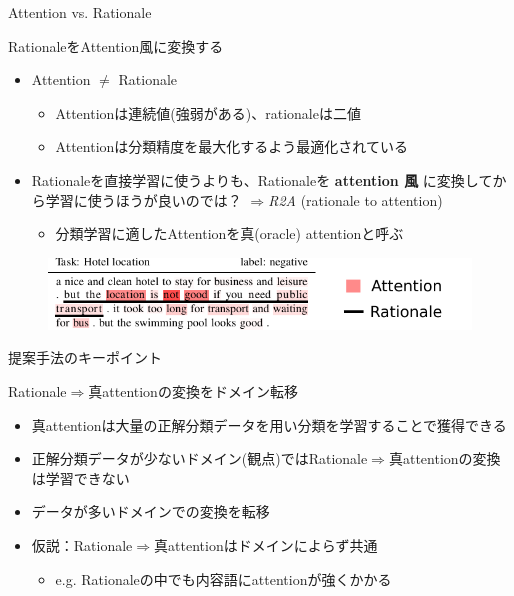 \begin{frame}{Attention vs. Rationale}
\begin{lead}
    RationaleをAttention風に変換する
\end{lead}
\begin{itemize}
\item Attention $\neq$ Rationale
\begin{itemize}
    \item Attentionは連続値(強弱がある)、rationaleは二値
    \item Attentionは分類精度を最大化するよう最適化されている
\end{itemize}
\item Rationaleを直接学習に使うよりも、Rationaleを \textbf{attention 風} に変換してから学習に使うほうが良いのでは？ $\Rightarrow$\emph{R2A} (rationale to attention)
\begin{itemize}
    \item 分類学習に適したAttentionを\alert{真(oracle) attention}と呼ぶ
\end{itemize}
\end{itemize}
\vspace*{-8pt}
\begin{figure}[H]
\centering
\includegraphics[width=\linewidth]{fig/attention_vs_rationale.pdf}
\end{figure}
\end{frame}

\begin{frame}{提案手法のキーポイント}
\begin{lead}
    Rationale$\Rightarrow$真attentionの変換をドメイン転移
\end{lead}
\begin{itemize}
\item 真attentionは大量の正解分類データを用い分類を学習することで獲得できる
\item 正解分類データが少ないドメイン(観点)ではRationale$\Rightarrow$真attentionの変換は学習できない
\item データが多いドメインでの変換を転移
\item 仮説：Rationale$\Rightarrow$真attentionは\alert{ドメインによらず共通}
\begin{itemize}
    \item e.g. Rationaleの中でも内容語にattentionが強くかかる
\end{itemize}
\end{itemize}
\end{frame}

